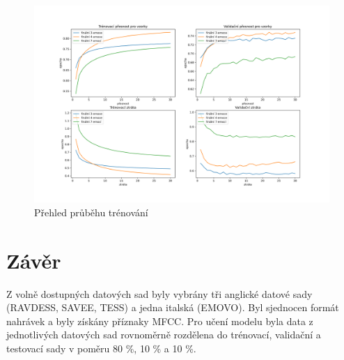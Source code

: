 \documentclass[FM,BP]{tulthesis}
\begin{document}
\begin{table}
\centering
{}
\caption{Přehled nejlepších výsledků finálních modelů}
\label{tab:best_results}
\end{table}
\FloatBarrier

\begin{figure}[!htbp]
\centerline{\includegraphics[scale=.5]{training_course-final.png}}
\caption{Přehled průběhu trénování}
\label{fig:final_training_course}
\end{figure}
\FloatBarrier

\chapter{Závěr}

Z volně dostupných datových sad byly vybrány tři anglické datové sady (RAVDESS, SAVEE, TESS) a jedna italská (EMOVO). Byl sjednocen formát nahrávek a byly získány příznaky MFCC. Pro učení modelu byla data z jednotlivých datových sad rovnoměrně rozdělena do trénovací, validační a testovací sady v poměru 80 \%, 10 \% a 10 \%.
\end{document}
